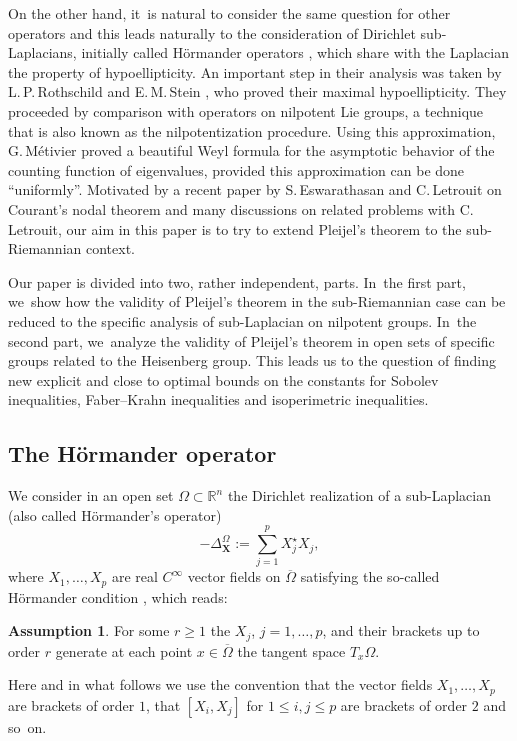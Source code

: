 \documentclass[JEP,XML,SOM,Unicode,published]{cedram}
\newcommand{\bX}{{\boldsymbol{X}}}
\theoremstyle{definition}
\newtheorem{assumption}[theorem]{Assumption}
\newcommand{\1}{\mathbbm{1}}
\begin{document}
On the other hand, it~is natural to consider the same question for other operators and this leads naturally to the consideration of Dirichlet sub-Laplacians, initially called Hörmander operators \cite{Ho}, which share with the Laplacian the property of hypoellipticity. An important step in
their analysis was taken by L.\,P.\,Rothschild and E.\,M.\,Stein \cite{RS}, who proved their maximal hypoellipticity. They proceeded by comparison with operators on nilpotent Lie groups, a technique that is also known as the nilpotentization procedure. Using this approximation, G.\,Métivier \cite{Me} proved a beautiful Weyl formula for the asymptotic behavior of the counting function of eigenvalues, provided this approximation can be done ``uniformly''. Motivated by a recent paper \cite{EL} by S.\,Eswarathasan and C.\,Letrouit on Courant's nodal theorem and many discussions on related problems with C.\,Letrouit, our aim in this paper is to try to extend Pleijel's theorem to the sub-Riemannian context.

Our paper is divided into two, rather independent, parts. In~the first part, we~show how the validity of Pleijel's theorem in the sub-Riemannian case can be reduced to the specific analysis of sub-Laplacian on nilpotent groups. In~the second part, we~analyze the validity of Pleijel's theorem in open sets of specific groups related to the Heisenberg group. This leads us to the question of finding new explicit and close to optimal bounds on the constants for Sobolev inequalities, Faber--Krahn inequalities and isoperimetric inequalities.

\subsection{The Hörmander operator}
We consider in an open set $\Omega \subset \mathbb R^n$ the Dirichlet realization of a sub-Laplacian (also called Hörmander's operator)
\[
-\Delta_\bX^\Omega :=\sum_{j=1}^p X_j^\star X_j,
\]
where $X_1,\ldots,X_p$ are real $C^\infty$ vector fields on $\overline\Omega$ satisfying the so-called Hörmander condition \cite{Ho}, which reads:

\begin{assumption}\label{CHOr}
For some $r\geq 1$ the $X_j$, $j=1,\ldots,p$, and their brackets up to order $r$ generate at each point $ x\in \overline{\Omega}$ the tangent space $T_x \Omega$.
\end{assumption}

Here and in what follows we use the convention that the vector fields $X_1,\ldots,X_p$ are brackets of order $1$, that $[X_i,X_j]$ for $1\leq i,j\leq p$ are brackets of order $2$ and so~on.
\end{document}
